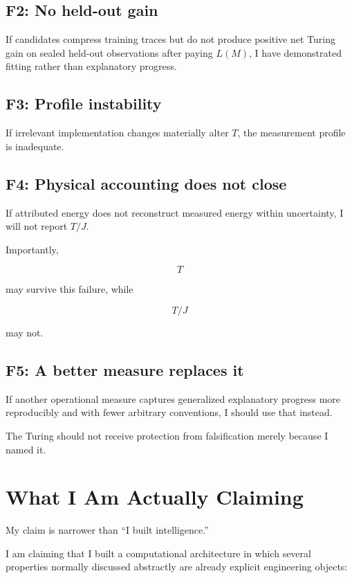 \documentclass[11pt]{article}
\begin{document}
\subsection{F2: No held-out gain}

If candidates compress training traces but do not produce positive net Turing gain on sealed held-out observations after paying \(L(M)\), I have demonstrated fitting rather than explanatory progress.

\subsection{F3: Profile instability}

If irrelevant implementation changes materially alter \(T\), the measurement profile is inadequate.

\subsection{F4: Physical accounting does not close}

If attributed energy does not reconstruct measured energy within uncertainty, I will not report \(T/J\).

Importantly,

\[
T
\]

may survive this failure, while

\[
T/J
\]

may not.

\subsection{F5: A better measure replaces it}

If another operational measure captures generalized explanatory progress more reproducibly and with fewer arbitrary conventions, I should use that instead.

The Turing should not receive protection from falsification merely because I named it.

\section{What I Am Actually Claiming}

My claim is narrower than ``I built intelligence.''

I am claiming that I built a computational architecture in which several properties normally discussed abstractly are already explicit engineering objects:
\end{document}
